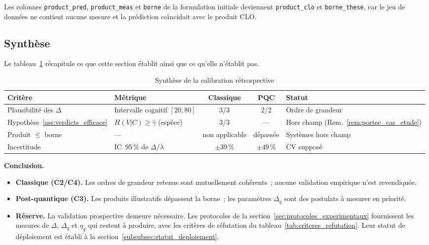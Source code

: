 \begin{sloppypar}
\label{subsec:echantillon_classiques}\label{subsec:echantillon_quantiques}
Les colonnes \texttt{product\_pred}, \texttt{product\_meas} et \texttt{borne} de la
formulation initiale deviennent \texttt{product\_clo} et \texttt{borne\_these}, car
le jeu de donn\'ees ne contient aucune mesure et la \og pr\'ediction\fg{} co\"{\i}ncidait
avec le produit CLO.
\end{sloppypar}

\subsection{Synth\`ese}
\label{sec:synthese_validation}
\begin{sloppypar}

Le tableau~\ref{tab:synthese_validation} r\'ecapitule ce que cette section
\'etablit ainsi que ce qu'elle n'\'etablit pas.

\begin{table}[htbp]
\centering
\caption{Synth\`ese de la calibration r\'etrospective}
\label{tab:synthese_validation}
\small
\begin{tabular}{@{}llccl@{}}
\toprule
\textbf{Crit\`ere} & \textbf{M\'etrique} & \textbf{Classique} & \textbf{PQC} &
\textbf{Statut} \\
\midrule
Plausibilit\'e des $\Delta$ & Intervalle cognitif $[20,80]$ & 3/3 & 2/2 & Ordre de grandeur \\
Hypoth\`ese~\ref{ass:verdicts_efficace} & $H(V|C) \geq \hat\gamma$ (esp\`ece) & 3/3 & --- & Hors champ (Rem.~\ref{rem:portee_cas_etude}) \\
Produit $\leq$ borne & --- & non applicable & d\'epass\'ee & Syst\`emes hors champ \\
Incertitude & IC~95\,\% de $\Delta/\lambda$ & $\pm 39\,\%$ & $\pm 49\,\%$ & CV suppos\'e \\
\bottomrule
\end{tabular}
\end{table}

\noindent\textbf{Conclusion.}
\begin{itemize}
\item \textbf{Classique (C2/C4).} Les ordres de grandeur retenus sont
  mutuellement coh\'erents~; aucune validation empirique n'est revendiqu\'ee.
\item \textbf{Post-quantique (C3).} Les produits illustratifs d\'epassent la
  borne~; les param\`etres $\Delta_q$ sont des postulats \`a mesurer en priorit\'e.
\item \textbf{R\'eserve.} La validation prospective demeure n\'ecessaire. Les
  protocoles de la section~\ref{sec:protocoles_experimentaux} fournissent les
  mesures de $\Delta$, $\Delta_q$ et $\eta_q$ qui restent \`a produire, avec les
  crit\`eres de r\'efutation du tableau~\ref{tab:criteres_refutation}. Leur
  statut de d\'eploiement est \'etabli \`a la
  section~\ref{subsubsec:statut_deploiement}.
\end{itemize}
\end{sloppypar}

